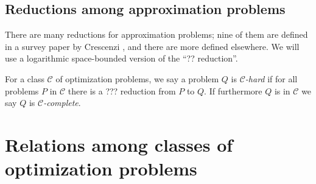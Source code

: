 \documentclass[]{article}
\newcommand{\APr}{\leq_{AP}^{L}}
\begin{document}
\subsection{Reductions among approximation problems}

There are many reductions for approximation problems; nine of them are defined in a survey paper by Crescenzi \cite{crescenzi97}, and there are more defined elsewhere.
We will use a logarithmic space-bounded version of the ``?? reduction''.%



For a class $\mathcal{C}$ of optimization problems, we say a problem $Q$ is \emph{$\mathcal{C}$-hard} if for all problems $P$ in $\mathcal{C}$ there is a ??? reduction from $P$ to $Q$.
If furthermore $Q$ is in $\mathcal{C}$ we say $Q$ is \emph{$\mathcal{C}$-complete}.

\section{Relations among classes of optimization problems}
\end{document}
